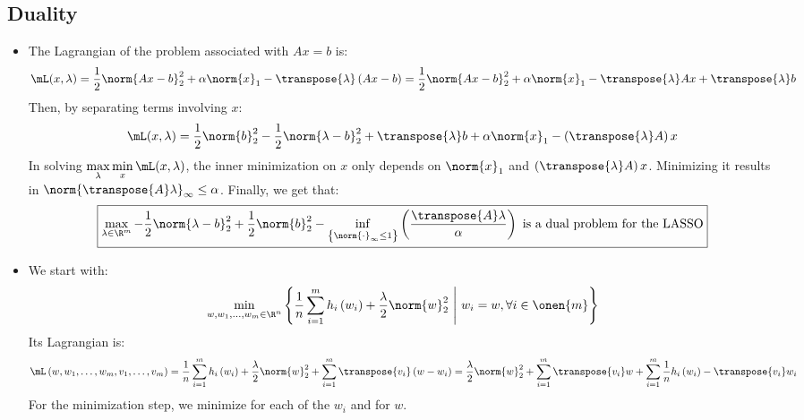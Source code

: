 \documentclass[math, info]{cours}
\begin{document}
\subsection*{Duality}
\begin{itemize}
	\item The Lagrangian of the problem associated with $Ax = b$ is:
		\begin{equation*}
			\mL(x, \lambda) = \frac{1}{2}\norm{Ax - b}_{2}^{2} + \alpha\norm{x}_{1} - \transpose{\lambda}\left( A x - b \right) = \frac{1}{2}\norm{Ax -b}_{2}^{2} + \alpha\norm{x}_{1} - \transpose{\lambda}Ax + \transpose{\lambda}b
		\end{equation*}
		Then, by separating terms involving $x$:
		\begin{equation*}
			\mL(x, \lambda) = \frac{1}{2}\norm{b}_{2}^{2} - \frac{1}{2}\norm{\lambda - b}^{2}_{2} + \transpose{\lambda}b + \alpha\norm{x}_{1} - \left( \transpose{\lambda}A \right)x
		\end{equation*}
		In solving $\displaystyle\max_{\lambda} \min_{x}\mL(x, \lambda)$, the inner minimization on $x$ only depends on $\norm{x}_{1}$ and $\left( \transpose{\lambda}A \right)x$.
		Minimizing it results in $\norm{\transpose{A}\lambda}_{\infty} \leq \alpha$.
		Finally, we get that:
		\begin{equation*}
			\boxed{\max_{\lambda \in \R^{m}} -\frac{1}{2}\norm{\lambda - b}_{2}^{2} + \frac{1}{2}\norm{b}_{2}^{2} - \inf_{\left\{ \norm{\cdot}_{\infty} \leq 1 \right\}}\left( \frac{\transpose{A}\lambda}{\alpha} \right) \text{ is a dual problem for the LASSO}}
		\end{equation*}
	\item We start with:
		\begin{equation*}
			\min_{w, w_{1}, \ldots, w_{m}\in\R^{n}} \left\{ \frac{1}{n}\sum_{i = 1}^{m}h_{i}\left( w_{i} \right) + \frac{\lambda}{2}\norm{w}_{2}^{2}\ \middle|\ w_{i} = w, \forall i \in \onen{m} \right\}
		\end{equation*}
		Its Lagrangian is:
		\begin{equation*}
			\mL\left( w, w_{1}, \ldots, w_{m}, v_{1}, \ldots, v_{m} \right) = \frac{1}{n}\sum_{i = 1}^{m} h_{i}\left( w_{i} \right) + \frac{\lambda}{2}\norm{w}_{2}^{2} + \sum_{i = 1}^{m}\transpose{v_{i}}\left( w - w_{i} \right) = \frac{\lambda}{2}\norm{w}_{2}^{2} + \sum_{i = 1}^{m}\transpose{v_{i}}w + \sum_{i = 1}^{m}\frac{1}{n}h_{i}\left( w_{i} \right) - \transpose{v_{i}}w_{i}
		\end{equation*}
		For the minimization step, we minimize for each of the $w_{i}$ and for $w$.

\end{itemize}
\end{document}
